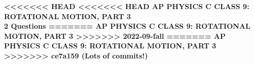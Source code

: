 \documentclass{../../oss-apphys-exam}
\begin{document}
\genheader

\begin{center}
  \textbf{
<<<<<<< HEAD
<<<<<<< HEAD
    AP PHYSICS C CLASS 9: ROTATIONAL MOTION, PART 3\\
    2 Questions
=======
    AP PHYSICS C CLASS 9: ROTATIONAL MOTION, PART 3
>>>>>>> 2022-09-fall
=======
    AP PHYSICS C CLASS 9: ROTATIONAL MOTION, PART 3
>>>>>>> ce7a159 (Lots of commits!)
  }
\end{center}

\begin{center}
\end{center}
\end{document}
